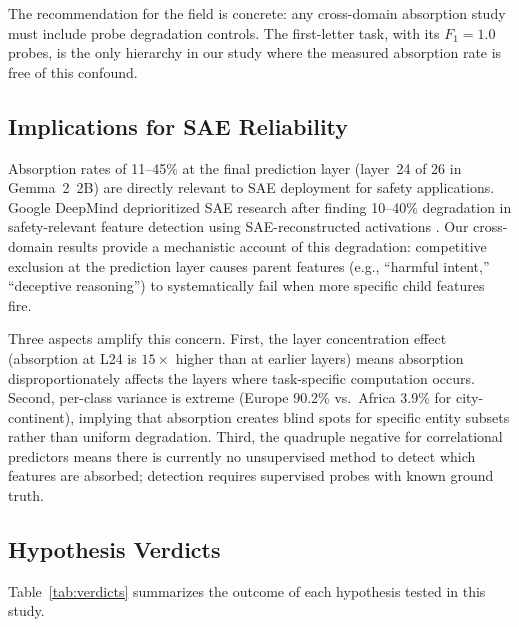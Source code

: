 \documentclass{article}
\begin{document}
The recommendation for the field is concrete: any cross-domain absorption study must include probe degradation controls. The first-letter task, with its $F_1 = 1.0$ probes, is the only hierarchy in our study where the measured absorption rate is free of this confound.

\subsection{Implications for SAE Reliability}

Absorption rates of 11--45\% at the final prediction layer (layer~24 of 26 in Gemma~2~2B) are directly relevant to SAE deployment for safety applications. Google DeepMind deprioritized SAE research after finding 10--40\% degradation in safety-relevant feature detection using SAE-reconstructed activations \citep{smith2025deprioritize}. Our cross-domain results provide a mechanistic account of this degradation: competitive exclusion at the prediction layer causes parent features (e.g., ``harmful intent,'' ``deceptive reasoning'') to systematically fail when more specific child features fire.

Three aspects amplify this concern. First, the layer concentration effect (absorption at L24 is $15\times$ higher than at earlier layers) means absorption disproportionately affects the layers where task-specific computation occurs. Second, per-class variance is extreme (Europe 90.2\% vs.\ Africa 3.9\% for city-continent), implying that absorption creates blind spots for specific entity subsets rather than uniform degradation. Third, the quadruple negative for correlational predictors means there is currently no unsupervised method to detect which features are absorbed; detection requires supervised probes with known ground truth.

\subsection{Hypothesis Verdicts}

Table~\ref{tab:verdicts} summarizes the outcome of each hypothesis tested in this study.
\end{document}

